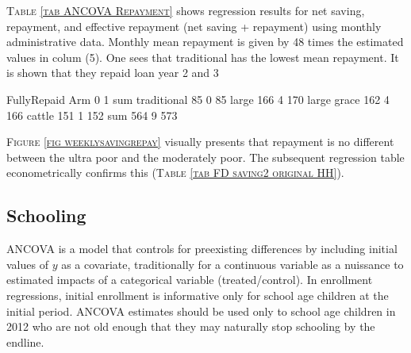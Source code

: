 \begin{palepinkleftbar}
\begin{finding}
\textsc{\small Table \ref{tab ANCOVA Repayment}} shows regression results for net saving, repayment, and effective repayment (net saving + repayment) using monthly administrative data. Monthly mean repayment is given by 48 times the estimated values in colum (5). One sees that \textsf{traditional} has the lowest mean repayment. It is shown that they repaid loan year 2 and 3 

\end{finding}
\end{palepinkleftbar}


\begin{Schunk}
\begin{Soutput}
             FullyRepaid
Arm             0   1 sum
  traditional  85   0  85
  large       166   4 170
  large grace 162   4 166
  cattle      151   1 152
  sum         564   9 573
\end{Soutput}
\end{Schunk}



\begin{palepinkleftbar}
\begin{finding}
\textsc{Figure \ref{fig weeklysavingrepay}} visually presents that repayment is no different between the ultra poor and the moderately poor. The subsequent regression table econometrically confirms this (\textsc{\normalsize Table \ref{tab FD saving2 original HH}}). 
\end{finding}
\end{palepinkleftbar}

\subsection{Schooling}

	ANCOVA is a model that controls for preexisting differences by including initial values of $y$ as a covariate, traditionally for a continuous variable as a nuissance to estimated impacts of a categorical variable (treated/control). In enrollment regressions, initial enrollment is informative only for school age children at the initial period. ANCOVA estimates should be used only to school age children in 2012 who are not old enough that they may naturally stop schooling by the endline.



